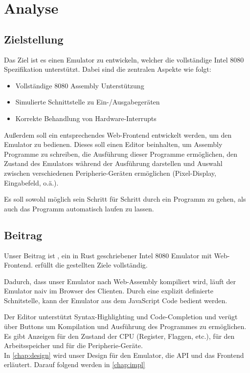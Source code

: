 \chapter{Analyse}

\section{Zielstellung}\label{goals}

Das Ziel ist es einen Emulator zu entwickeln, welcher die vollständige Intel 8080 Spezifikation unterstützt. Dabei sind die zentralen Aspekte wie folgt:

\begin{itemize}
    \item Vollständige 8080 Assembly Unterstützung
    \item Simulierte Schnittstelle zu Ein-/Ausgabegeräten
    \item Korrekte Behandlung von Hardware-Interrupts
\end{itemize}



Außerdem soll ein entsprechendes Web-Frontend entwickelt werden, um den Emulator zu bedienen.
Dieses soll einen Editor beinhalten, um Assembly Programme zu schreiben, die Ausführung dieser Programme ermöglichen, den Zustand des Emulators während der Ausführung darstellen und Auswahl zwischen verschiedenen Peripherie-Geräten ermöglichen (Pixel-Display, Eingabefeld, o.ä.). 

Es soll sowohl möglich sein Schritt für Schritt durch ein Programm zu gehen, als auch das Programm automatisch laufen zu lassen.

\section{Beitrag}

Unser Beitrag ist \Emu, ein in Rust geschriebener Intel 8080 Emulator mit Web-Frontend. \Emu erfüllt die gestellten Ziele vollständig.

Dadurch, dass unser Emulator nach Web-Assembly kompiliert wird, läuft der Emulator naiv im Browser des Clienten. Durch eine explizit definierte Schnitstelle, kann der Emulator aus dem JavaScript Code bedient werden.

Der Editor unterstützt Syntax-Highlighting und Code-Completion und verügt über Buttons um Kompilation und Ausführung des Programmes zu ermöglichen.
Es gibt Anzeigen für den Zustand der CPU (Register, Flaggen, etc.), für den Arbeitsspeicher und für die Peripherie-Geräte.\\

In \cref{chap:design} wird unser Design für den Emulator, die API und das Frontend
erläutert. Darauf folgend werden in \cref{chap:impl}
